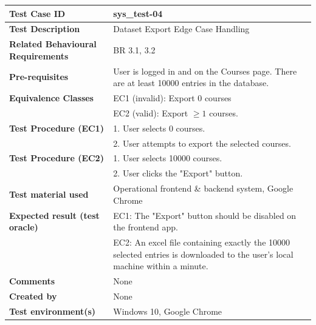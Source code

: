 
\begin{table}[h]
\small
\renewcommand{\arraystretch}{1.1}
\begin{tabularx}{\linewidth}{>{\bfseries}l X}
\hline
Test Case ID & sys\_test-04 \\ \hline
Test Description & Dataset Export Edge Case Handling \\ \hline
Related Behavioural Requirements & BR 3.1, 3.2 \\ \hline
Pre-requisites & User is logged in and on the Courses page. There are at least 10000 entries in the database. \\ \hline
Equivalence Classes & EC1 (invalid): Export 0 courses \\ & EC2 (valid): Export $\geq 1$ courses. \\ \hline
Test Procedure (EC1) & 1. User selects 0 courses.\\ & 2. User attempts to export the selected courses. \\ \hline
Test Procedure (EC2) & 1. User selects 10000 courses.\\ & 2. User clicks the "Export" button. \\ \hline
Test material used & Operational frontend \& backend system, Google Chrome \\ \hline
Expected result (test oracle) & EC1: The "Export" button should be disabled on the frontend app. \\ & EC2: An excel file containing exactly the 10000 selected entries is downloaded to the user's local machine within a minute. \\ \hline
Comments & None \\ \hline
Created by & None \\ \hline
Test environment(s) & Windows 10, Google Chrome \\ \hline
\end{tabularx}
\end{table}

